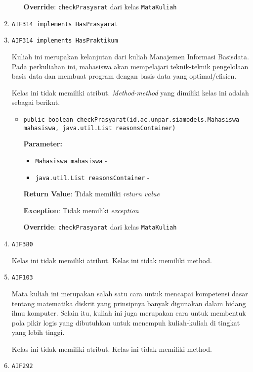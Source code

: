 \documentclass{article}
\begin{document}
\begin{enumerate}
\begin{itemize}
\textbf{Override}: \texttt{checkPrasyarat} dari kelas \texttt{MataKuliah}

\end{itemize}
\item \texttt{AIF314 implements HasPrasyarat}

\item \texttt{AIF314 implements HasPraktikum}

Kuliah ini merupakan kelanjutan dari kuliah Manajemen Informasi Basisdata.
 Pada perkuliahan ini, mahasiswa akan mempelajari teknik-teknik pengelolaan
 basis data dan membuat program dengan basis data yang optimal/efisien.

Kelas ini tidak memiliki atribut. \textit{Method-method} yang dimiliki kelas ini adalah sebagai berikut.
\begin{itemize}
\item \texttt{public boolean checkPrasyarat(id.ac.unpar.siamodels.Mahasiswa mahasiswa, java.util.List reasonsContainer)}

\textbf{Parameter:}
\begin{itemize}
\item \texttt{Mahasiswa mahasiswa} - 
\item \texttt{java.util.List reasonsContainer} - 
\end{itemize}
\textbf{Return Value}: Tidak memiliki \textit{return value}

\textbf{Exception}: Tidak memiliki \textit{exception}

\textbf{Override}: \texttt{checkPrasyarat} dari kelas \texttt{MataKuliah}

\end{itemize}
\item \texttt{AIF380}



Kelas ini tidak memiliki atribut. Kelas ini tidak memiliki method. \item \texttt{AIF103}

Mata kuliah ini merupakan salah satu cara untuk mencapai kompetensi dasar 
 tentang matematika diskrit yang prinsipnya banyak digunakan dalam bidang 
 ilmu komputer. Selain itu, kuliah ini juga merupakan cara untuk membentuk 
 pola pikir logis yang dibutuhkan untuk menempuh kuliah-kuliah di tingkat 
 yang lebih tinggi.

Kelas ini tidak memiliki atribut. Kelas ini tidak memiliki method. \item \texttt{AIF292}




\end{enumerate}
\end{document}
